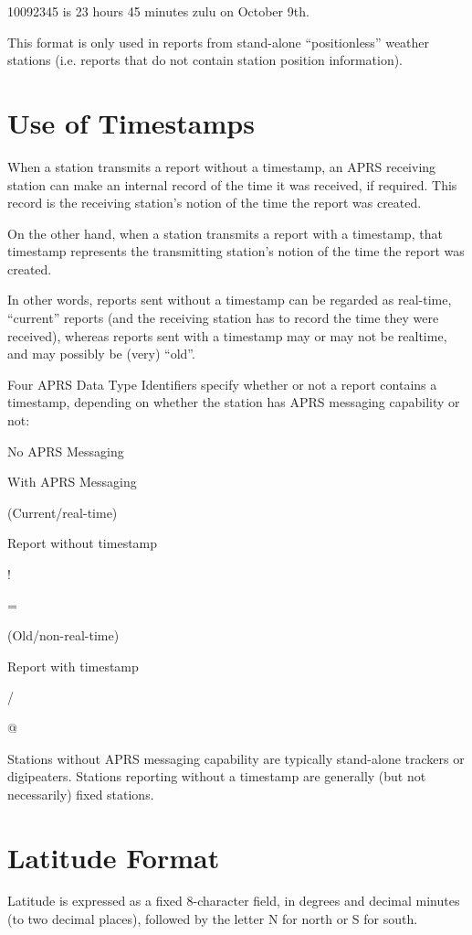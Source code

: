 10092345 is 23 hours 45 minutes zulu on October 9th.

This format is only used in reports from stand-alone “positionless” weather
stations (i.e. reports that do not contain station position information).

\section{Use of Timestamps}

When a station transmits a report without a timestamp, an APRS receiving
station can make an internal record of the time it was received, if required.
This record is the receiving station’s notion of the time the report was
created.

On the other hand, when a station transmits a report with a timestamp, that
timestamp represents the transmitting station’s notion of the time the report
was created.

In other words, reports sent without a timestamp can be regarded as
real-time, “current” reports (and the receiving station has to record
the time they were received), whereas reports sent with a timestamp
may or may not be realtime, and may possibly be (very) “old”.

Four APRS Data Type Identifiers specify whether or not a report
contains a timestamp, depending on whether the station has APRS
messaging capability or not:



No APRS
Messaging

With APRS
Messaging

(Current/real-time)

Report without timestamp

!

=

(Old/non-real-time)

Report with timestamp

/

@

Stations without APRS messaging capability are typically stand-alone
trackers or digipeaters. Stations reporting without a timestamp are generally
(but not necessarily) fixed stations.

\section{Latitude Format}

Latitude is expressed as a fixed 8-character field, in degrees and decimal
minutes (to two decimal places), followed by the letter N for north or S for
south.

